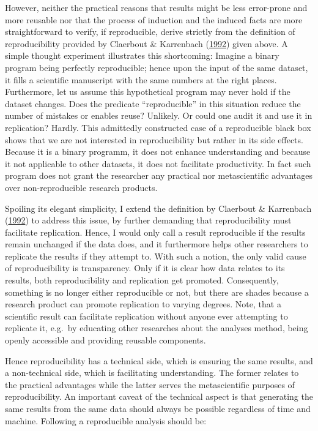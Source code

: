 \documentclass[12pt,a4paper,]{article}
\begin{document}
However, neither the practical reasons that results might be less error-prone and more reusable nor that the process of induction and the induced facts are more straightforward to verify, if reproducible, derive strictly from the definition of reproducibility provided by Claerbout \& Karrenbach (\protect\hyperlink{ref-claerboutElectronicDocumentsGive1992}{1992}) given above.
A simple thought experiment illustrates this shortcoming:
Imagine a binary program being perfectly reproducible; hence upon the input of the same dataset, it fills a scientific manuscript with the same numbers at the right places.
Furthermore, let us assume this hypothetical program may never hold if the dataset changes.
Does the predicate ``reproducible'' in this situation reduce the number of mistakes or enables reuse? Unlikely.
Or could one audit it and use it in replication? Hardly.
This admittedly constructed case of a reproducible black box shows that we are not interested in reproducibility but rather in its side effects.
Because it is a binary programm, it does not enhance understanding and because it not applicable to other datasets, it does not facilitate productivity.
In fact such program does not grant the researcher any practical nor metascientific advantages over non-reproducible research products.

Spoiling its elegant simplicity, I extend the definition by Claerbout \& Karrenbach (\protect\hyperlink{ref-claerboutElectronicDocumentsGive1992}{1992}) to address this issue, by further demanding that reproducibility must facilitate replication.
Hence, I would only call a result reproducible if the results remain unchanged if the data does, and it furthermore helps other researchers to replicate the results if they attempt to.
With such a notion, the only valid cause of reproducibility is transparency.
Only if it is clear how data relates to its results, both reproducibility and replication get promoted.
Consequently, something is no longer either reproducible or not, but there are shades because a research product can promote replication to varying degrees.
Note, that a scientific result can facilitate replication without anyone ever attempting to replicate it, e.g.~by educating other researches about the analyses method, being openly accessible and providing reusable components.

Hence reproducibility has a technical side, which is ensuring the same results, and a non-technical side, which is facilitating understanding.
The former relates to the practical advantages while the latter serves the metascientific purposes of reproducibility.
An important caveat of the technical aspect is that generating the same results from the same data should always be possible regardless of time and machine.
Following a reproducible analysis should be:
\end{document}
